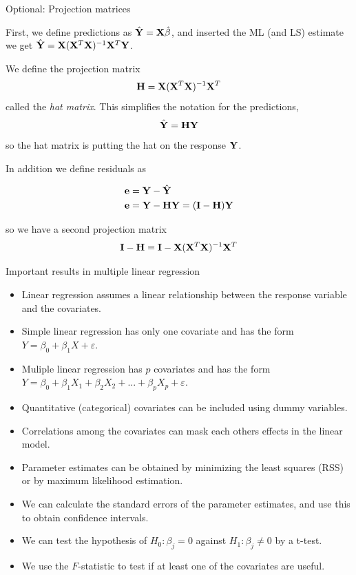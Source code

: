 \documentclass[10pt,ignorenonframetext,]{beamer}
\providecommand{\tightlist}{%
  \setlength{\itemsep}{0pt}\setlength{\parskip}{0pt}}
\begin{document}
\begin{frame}

\begin{block}{Optional: Projection matrices}

First, we define predictions as \(\hat{\bf Y}={\bf X}\hat{\beta}\), and
inserted the ML (and LS) estimate we get
\(\hat{\bf Y}={\bf X}({\bf X}^T{\bf X})^{-1}{\bf X}^T{\bf Y}\).

We define the projection matrix
\[  {\bf H}={\bf X}({\bf X}^T{\bf X})^{-1} {\bf X}^T\] called the
\emph{hat matrix}. This simplifies the notation for the predictions,
\[\hat{\bf Y}={\bf H}{\bf Y}\] so the hat matrix is putting the hat on
the response \({\bf Y}\).

In addition we define residuals as

\begin{align*}
{\bf e}&={\bf Y}-\hat{\bf Y} \\
{\bf e}&={\bf Y}-{\bf HY}=({\bf I-H}){\bf Y}\\
\end{align*}

so we have a second projection matrix
\[ {\bf I-H}={\bf I}-{\bf X}({\bf X}^T{\bf X})^{-1} {\bf X}^T \]

\end{block}

\end{frame}

\begin{frame}{Important results in multiple linear regression}

\begin{itemize}
\tightlist
\item
  Linear regression assumes a linear relationship between the response
  variable and the covariates.
\item
  Simple linear regression has only one covariate and has the form
  \(Y = \beta_0 + \beta_1 X + \varepsilon\).
\item
  Muliple linear regression has \(p\) covariates and has the form
  \(Y = \beta_0 + \beta_1 X_1 + \beta_2 X_2 + ... + \beta_p X_p + \varepsilon\).
\item
  Quantitative (categorical) covariates can be included using dummy
  variables.
\item
  Correlations among the covariates can mask each others effects in the
  linear model.
\item
  Parameter estimates can be obtained by minimizing the least squares
  (RSS) or by maximum likelihood estimation.
\item
  We can calculate the standard errors of the parameter estimates, and
  use this to obtain confidence intervals.
\item
  We can test the hypothesis of \(H_0 : \beta_j = 0\) against
  \(H_1: \beta_j \neq 0\) by a t-test.
\item
  We use the \(F\)-statistic to test if at least one of the covariates
  are useful.
\end{itemize}

\end{frame}
\end{document}
